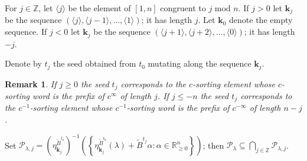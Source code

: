 \documentclass{amsart}
\newtheorem{remark}[theorem]{Remark}
\numberwithin{theorem}{section}
\newcommand{\bfk}{{\boldsymbol{k}}}
\newcommand{\cP}{\mathcal{P}}
\newcommand{\RR}{\mathbb{R}}
\newcommand{\ZZ}{\mathbb{Z}}
\begin{document}
For $j\in\ZZ$, let $\langle j\rangle$ be the element of $[1,n]$ congruent to $j$ mod $n$.
If $j>0$ let $\bfk_j$ be the sequence $(\langle j \rangle, \langle j-1 \rangle,\dots,\langle 1\rangle)$; it has length $j$.
Let $\bfk_0$ denote the empty sequence.
If $j<0$ let $\bfk_j$ be the sequence $(\langle j+1 \rangle, \langle j+2 \rangle, \dots, \langle 0 \rangle)$; it has length $-j$.

Denote by $t_j$ the seed obtained from $t_0$ mutating along the sequence $\bfk_j$.
\begin{remark}
  \label{rk:seed to sorting}
  If $j \geq 0$ the seed $t_j$ corresponds to the $c$-sorting element whose $c$-sorting word is the prefix of $c^{\infty}$ of length $j$.
  If $j\leq -n$ the seed $t_j$ corresponds to the $c^{-1}$-sorting element whose $c^{-1}$-sorting word is the prefix of  $c^{-\infty}$ of length $n-j$.
\end{remark}
Set $\cP_{\lambda,j}= \left(\eta^{\widetilde B^{t_0}}_{\bfk_j}\right)^{-1}\left(\left\{\eta^{\widetilde B^{t_0}}_{\bfk_j}(\lambda)+ \widetilde B^{t_j}\alpha:\alpha\in\RR^n_{\ge0}\right\}\right)$; then $\cP_\lambda\subseteq \bigcap_{j\in\ZZ} \cP_{\lambda,j}$.
\end{document}
